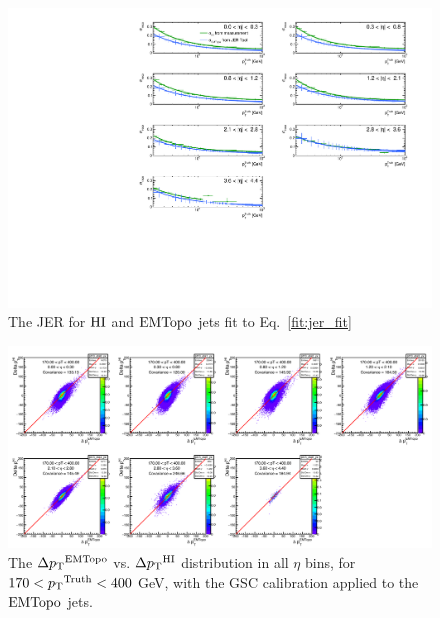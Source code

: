     \begin{figure}
        \centering
        \includegraphics[width=1\textwidth]{figures/qualification/fitted_jer}
		\caption{The JER for $\mathrm{HI}$ and $\text{EMTopo}$ jets fit to Eq.~\ref{fit:jer_fit}}
		\label{fig:fitted_jer}
	\end{figure}





\begin{figure}
        \centering
        \includegraphics[width=1\textwidth]{figures/qualification/deltapT_w_gsc}
		\caption{The $\Delta\mbox{$p_{\mathrm{T}}$}^{\text{EMTopo}}$ vs. $\Delta\mbox{$p_{\mathrm{T}}$}^{\mathrm{HI}}$ distribution in all $\eta$ bins, for $ 170 < \mbox{$p_{\mathrm{T}}$}^{\mathrm{Truth}} < 400$ GeV, with the GSC calibration applied to the $\text{EMTopo}$ jets. }
		\label{fig:deltapT_w_gsc}
    \end{figure}%

